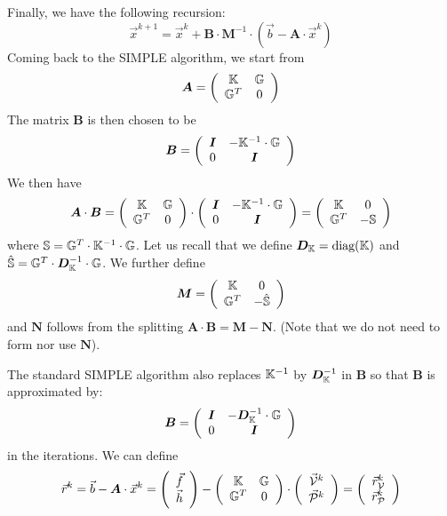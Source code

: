 Finally, we have the following recursion:
\begin{equation}
\boxed{\vec{x}^{k+1} = \vec{x}^k +{\bm B} \cdot {\bm M} ^{-1}\cdot (\vec{b} -{\bm A}\cdot \vec{x}^{k}  ) }
\label{eq:simplerec}
\end{equation}
Coming back to the SIMPLE algorithm, we start from 
\[
{\bm A}=
\left(
\begin{array}{cc}
{\mathbb{K}} & {\mathbb{G}} \\
{\mathbb{G}}^T & 0
\end{array}
\right)
\]
The matrix ${\bm B}$ is then chosen to be 
\[
{\bm B}=
\left(
\begin{array}{cc}
{\bm I} & -{\mathbb{K}}^{-1} \cdot {\mathbb{G}} \\
0 & {\bm I}
\end{array}
\right)
\]
We then have 
\[
{\bm A}\cdot  {\bm B} = 
\left(
\begin{array}{cc}
{\mathbb{K}} & {\mathbb{G}} \\
{\mathbb{G}}^T & 0
\end{array}
\right)
\cdot 
\left(
\begin{array}{cc}
{\bm I} & -{\mathbb{K}}^{-1} \cdot {\mathbb{G}} \\
0 & {\bm I}
\end{array}
\right)
=
\left(
\begin{array}{cc}
{\mathbb{K}} & 0 \\
{\mathbb{G}}^T & -{\mathbb{S}}
\end{array}
\right)
\]
where ${\mathbb{S}}={\mathbb{G}}^T \cdot {\mathbb{K}}^{-1} \cdot {\mathbb{G}}$.
Let us recall that we define ${\bm D}_{\mathbb{K}} =\text{diag}({\mathbb{K}})$ and $\hat{{\mathbb{S}}}={\mathbb{G}}^T \cdot {\bm D}_{\mathbb{K}}^{-1} \cdot {\mathbb{G}}$. 
We further define 
\[
{\bm M}=
\left(
\begin{array}{cc}
{\mathbb{K}} & 0 \\
{\mathbb{G}}^T & -\hat{{\mathbb{S}}}
\end{array}
\right)
\]
and ${\bm N}$ follows from the splitting ${\bm A}\cdot {\bm B}= {\bm M} - {\bm N}$. 
(Note that we do not need to form nor use ${\bm N}$).

The standard SIMPLE algorithm also replaces ${\mathbb{K}}^{-1}$  by  ${\bm D}_{\mathbb{K}}^{-1}$ in ${\bm B}$ so that 
${\bm B}$ is approximated by:
\[
{\bm B}=
\left(
\begin{array}{cc}
{\bm I} & -{\bm D}_{\mathbb{K}}^{-1} \cdot {\mathbb{G}} \\
0 & {\bm I}
\end{array}
\right)
\]
in the iterations.
We can define 
\[
\vec{r}^k=
\vec{b}-{\bm A}\cdot \vec{x}^k = 
\left(
\begin{array}{c}
\vec{f} \\ \vec{h}
\end{array}
\right)
-
\left(
\begin{array}{cc}
{\mathbb{K}} & {\mathbb{G}} \\
{\mathbb{G}}^T & 0
\end{array}
\right)
\cdot
\left(
\begin{array}{c}
\vec{\cal V}^k \\ \vec{\cal P}^k
\end{array}
\right)
=
\left(
\begin{array}{c}
\vec{r}_{\cal V}^k \\ \vec{r}_{\cal P}^k
\end{array}
\right)
\]

